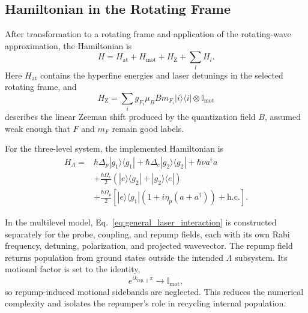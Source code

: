 \subsection{Hamiltonian in the Rotating Frame}
\label{subsec:rotating_hamiltonian}

After transformation to a rotating frame and application of the rotating-wave approximation, the Hamiltonian is
\begin{equation}
    H
    =
    H_{\mathrm{at}}
    +
    H_{\mathrm{mot}}
    +
    H_{\mathrm{Z}}
    +
    \sum_l H_l.
    \label{eq:total_hamiltonian_numerical}
\end{equation}
Here $H_{\mathrm{at}}$ contains the hyperfine energies and laser detunings in the selected rotating frame, and
\begin{equation}
    H_{\mathrm{Z}}
    =
    \sum_i
    g_{F_i}\mu_B B m_{F_i}
    |i\rangle\langle i|
    \otimes\mathbb I_{\mathrm{mot}}
    \label{eq:zeeman_hamiltonian}
\end{equation}
describes the linear Zeeman shift produced by the quantization field $B$, assumed weak enough that $F$ and $m_F$ remain good labels.

For the three-level system, the implemented Hamiltonian is
\begin{align}
    H_{\Lambda}
    ={}&
    \hbar\Delta_p|g_1\rangle\langle g_1|
    +
    \hbar\Delta_c|g_2\rangle\langle g_2|
    +
    \hbar\nu a^\dagger a
    \nonumber\\
    &+
    \frac{\hbar\Omega_c}{2}
    \left(
        |e\rangle\langle g_2|
        +
        |g_2\rangle\langle e|
    \right)
    \nonumber\\
    &+
    \frac{\hbar\Omega_p}{2}
    \left[
        |e\rangle\langle g_1|
        \left(1+i\eta_p(a+a^\dagger)\right)
        +
        \mathrm{h.c.}
    \right].
    \label{eq:three_level_numerical_hamiltonian}
\end{align}

In the multilevel model, Eq.~\eqref{eq:general_laser_interaction} is constructed separately for the probe, coupling, and repump fields, each with its own Rabi frequency, detuning, polarization, and projected wavevector. The repump field returns population from ground states outside the intended $\Lambda$ subsystem. Its motional factor is set to the identity,
\begin{equation}
    e^{ik_{\mathrm{rep},\parallel}x}\rightarrow
    \mathbb I_{\mathrm{mot}},
    \label{eq:repump_no_motion}
\end{equation}
so repump-induced motional sidebands are neglected. This reduces the numerical complexity and isolates the repumper's role in recycling internal population.

